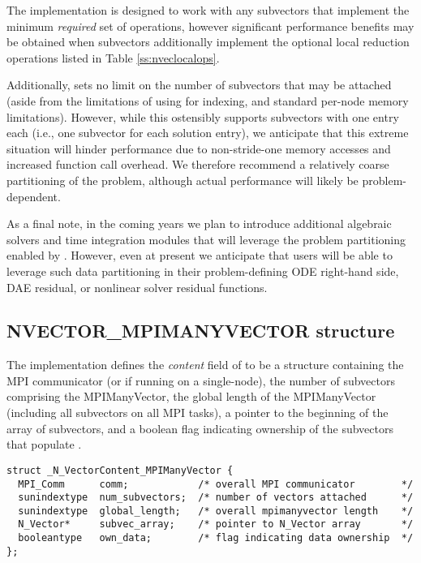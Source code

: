 The {\nvecmpimanyvector} implementation is designed to work with any
{\nvector} subvectors that implement the minimum \emph{required} set
of operations, however significant performance benefits may be
obtained when subvectors additionally implement the optional local
reduction operations listed in Table \ref{ss:nveclocalops}.

Additionally, {\nvecmpimanyvector} sets no limit on the number of
subvectors that may be attached (aside from the limitations of using
 for indexing, and standard per-node memory
limitations).  However, while this ostensibly supports subvectors
with one entry each (i.e., one subvector for each solution entry), we
anticipate that this extreme situation will hinder performance due to
non-stride-one memory accesses and increased function call overhead.
We therefore recommend a relatively coarse partitioning of the
problem, although actual performance will likely be
problem-dependent.

As a final note, in the coming years we plan to introduce additional
algebraic solvers and time integration modules that will leverage the
problem partitioning enabled by {\nvecmpimanyvector}.  However, even at
present we anticipate that users will be able to leverage such data
partitioning in their problem-defining ODE right-hand side, DAE
residual, or nonlinear solver residual functions.


\subsection{NVECTOR\_MPIMANYVECTOR structure}
\label{ss:nvec_mpimanyvector_structure}


The {\nvecmpimanyvector} implementation defines the {\em content} field
of  to be a structure containing the MPI communicator
(or  if running on a single-node), the number of
subvectors comprising the MPIManyVector, the global length of the
MPIManyVector (including all subvectors on all MPI tasks), a pointer to
the beginning of the array of subvectors, and a boolean flag
 indicating ownership of the subvectors that populate
.
\begin{verbatim} 
struct _N_VectorContent_MPIManyVector {
  MPI_Comm      comm;            /* overall MPI communicator        */
  sunindextype  num_subvectors;  /* number of vectors attached      */
  sunindextype  global_length;   /* overall mpimanyvector length    */
  N_Vector*     subvec_array;    /* pointer to N_Vector array       */
  booleantype   own_data;        /* flag indicating data ownership  */
};
\end{verbatim}

